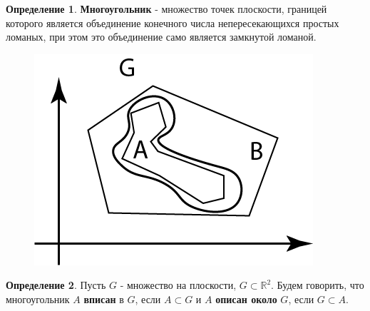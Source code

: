 \documentclass{report}
\theoremstyle{definition}
\newtheorem{definition}{Определение}[section]
\begin{document}
\begin{definition}
  \textbf{Многоугольник} - множество точек плоскости, границей которого является объединение конечного
  числа непересекающихся простых ломаных, при этом это объединение само является замкнутой ломаной.
  \begin{figure}[H]
    \begin{center}
      \includegraphics[scale=0.3]{graph17.png}\label{figure17}
    \end{center}
  \end{figure}
\end{definition}


\begin{definition}
  Пусть $G$ - множество на плоскости, $G\subset\mathbb{R}^2$. Будем говорить, что многоугольник $A$
  \textbf{вписан} в $G$, если $A \subset G$ и $A$ \textbf{описан около} $G$, если $G \subset A$.
\end{definition}
\end{document}
